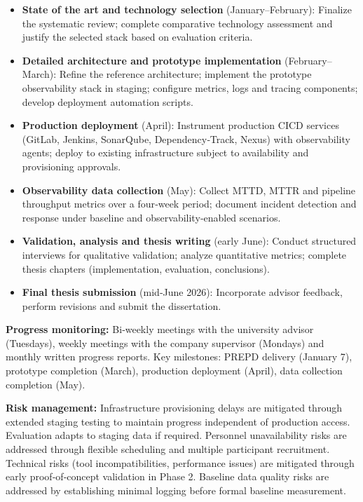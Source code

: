 \documentclass[12pt]{article}
\begin{document}
\begin{itemize}
    \item \textbf{State of the art and technology selection} (January–February): Finalize the systematic review; complete comparative technology assessment and justify the selected stack based on evaluation criteria.

    \item \textbf{Detailed architecture and prototype implementation} (February–March): Refine the reference architecture; implement the prototype observability stack in staging; configure metrics, logs and tracing components; develop deployment automation scripts.

    \item \textbf{Production deployment} (April): Instrument production \ac{CICD} services (GitLab, Jenkins, SonarQube, Dependency‑Track, Nexus) with observability agents; deploy to existing infrastructure subject to availability and provisioning approvals.

    \item \textbf{Observability data collection} (May): Collect \ac{MTTD}, \ac{MTTR} and pipeline throughput metrics over a four‑week period; document incident detection and response under baseline and observability‑enabled scenarios.

    \item \textbf{Validation, analysis and thesis writing} (early June): Conduct structured interviews for qualitative validation; analyze quantitative metrics; complete thesis chapters (implementation, evaluation, conclusions).

    \item \textbf{Final thesis submission} (mid‑June 2026): Incorporate advisor feedback, perform revisions and submit the dissertation.
\end{itemize}

\textbf{Progress monitoring:} Bi‑weekly meetings with the university advisor (Tuesdays), weekly meetings with the company supervisor (Mondays) and monthly written progress reports. Key milestones: PREPD delivery (January 7), prototype completion (March), production deployment (April), data collection completion (May).

\textbf{Risk management:} Infrastructure provisioning delays are mitigated through extended staging testing to maintain progress independent of production access. Evaluation adapts to staging data if required. Personnel unavailability risks are addressed through flexible scheduling and multiple participant recruitment. Technical risks (tool incompatibilities, performance issues) are mitigated through early proof‑of‑concept validation in Phase 2. Baseline data quality risks are addressed by establishing minimal logging before formal baseline measurement.
\end{document}
